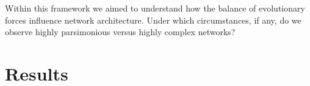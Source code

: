 \documentclass{article}
\newcommand{\1}{\mathbbm{1}}
\begin{document}
Within this framework we aimed to understand how the balance of evolutionary forces
influence network architecture. Under which circumstances, if any, do we observe
highly parsimonious versus highly complex networks?


\section{Results}
%
%
%
%
%
%
\end{document}
